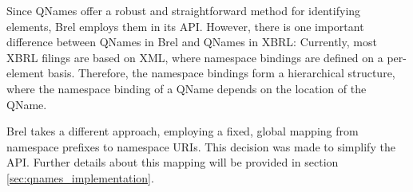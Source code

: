Since QNames offer a robust and straightforward method for identifying elements,
Brel employs them in its API.
However, there is one important difference between QNames in Brel and QNames in XBRL:
Currently, most XBRL filings are based on XML, where namespace bindings are defined on a per-element basis.
Therefore, the namespace bindings form a hierarchical structure,
where the namespace binding of a QName depends on the location of the QName.

Brel takes a different approach, employing a fixed, global mapping from namespace prefixes to namespace URIs.
This decision was made to simplify the API.
Further details about this mapping will be provided in section \ref{sec:qnames_implementation}.




    
    
    




